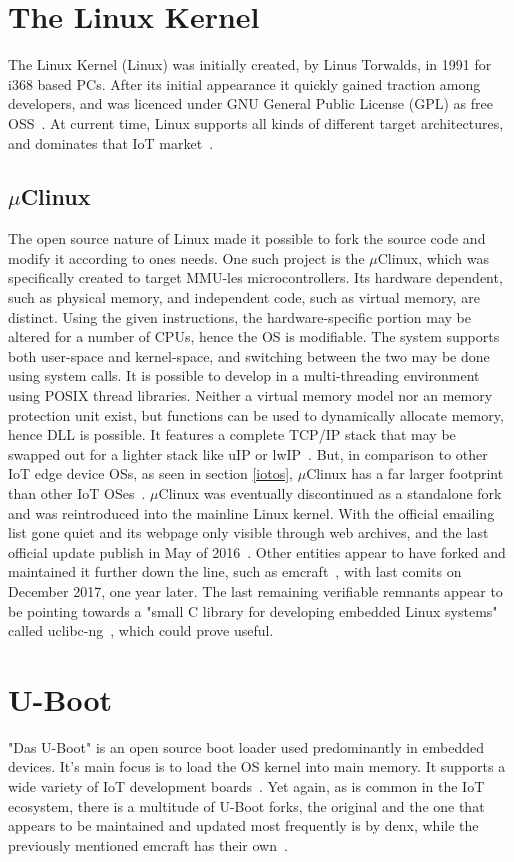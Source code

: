 \section{The Linux Kernel}
The Linux Kernel (Linux) was initially created, by Linus Torwalds, in 1991 for i368 based PCs. After its initial appearance it quickly gained traction among developers, and was licenced under GNU General Public License (GPL) as free OSS~\cite{linuxlicense}. At current time, Linux supports all kinds of different target architectures, and dominates that IoT market~\cite{sabri2017comparison}.


\subsection{$\mu$Clinux}\label{uclinux}
The open source nature of Linux made it possible to fork the source code and modify it according to ones needs. One such project is the $\mu$Clinux, which was specifically created to target MMU-les microcontrollers. Its hardware dependent, such as physical memory, and independent code, such as virtual memory, are distinct. Using the given instructions, the hardware-specific portion may be altered for a number of CPUs, hence the OS is modifiable. The system supports both user-space and kernel-space, and switching between the two may be done using system calls. It is possible to develop in a multi-threading environment using POSIX thread libraries. Neither a virtual memory model nor an memory protection unit exist, but functions can be used to dynamically allocate memory, hence DLL is possible. It features a complete TCP/IP stack that may be swapped out for a lighter stack like uIP or lwIP~\cite{dunkels2003full}. But, in comparison to other IoT edge device OSs, as seen in section \ref{iotos}, $\mu$Clinux has a far larger footprint than other IoT OSes~\cite{gaur2015operating}. $\mu$Clinux was eventually discontinued as a standalone fork and was reintroduced into the mainline Linux kernel. With the official emailing list gone quiet and its webpage only visible through web archives, and the last official update publish in May of 2016~\cite{uclinux.org}. Other entities appear to have forked and maintained it further down the line, such as emcraft~\cite{emcraft, emuClinux}, with last comits on December 2017, one year later. The last remaining verifiable remnants appear to be pointing towards a "small C library for developing embedded Linux systems" called uclibc-ng~\cite{uclibc-ng}, which could prove useful.

\section{U-Boot}
"Das U-Boot" is an open source boot loader used predominantly in embedded devices. It's main focus is to load the OS kernel into main memory. It supports a wide variety of IoT development boards~\cite{u-boot-doc}. Yet again, as is common in the IoT ecosystem, there is a multitude of U-Boot forks, the original and the one that appears to be maintained and updated most frequently is by denx, while the previously mentioned emcraft has their own~\cite{emUboot}. 

